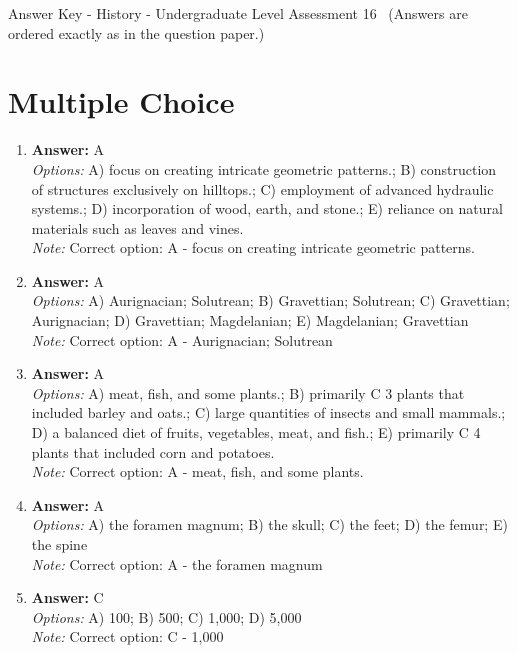 \documentclass[12pt]{article}
\begin{document}
\begin{center}
Answer Key - History - Undergraduate Level Assessment 16 \
\small (Answers are ordered exactly as in the question paper.)
\end{center}

\section*{Multiple Choice}
\begin{enumerate}[label=\arabic*.]
\item \textbf{Answer:} A
\\ \textit{Options:} A) focus on creating intricate geometric patterns.; B) construction of structures exclusively on hilltops.; C) employment of advanced hydraulic systems.; D) incorporation of wood, earth, and stone.; E) reliance on natural materials such as leaves and vines.
\\ \textit{Note:} Correct option: A - focus on creating intricate geometric patterns.
\item \textbf{Answer:} A
\\ \textit{Options:} A) Aurignacian; Solutrean; B) Gravettian; Solutrean; C) Gravettian; Aurignacian; D) Gravettian; Magdelanian; E) Magdelanian; Gravettian
\\ \textit{Note:} Correct option: A - Aurignacian; Solutrean
\item \textbf{Answer:} A
\\ \textit{Options:} A) meat, fish, and some plants.; B) primarily C 3 plants that included barley and oats.; C) large quantities of insects and small mammals.; D) a balanced diet of fruits, vegetables, meat, and fish.; E) primarily C 4 plants that included corn and potatoes.
\\ \textit{Note:} Correct option: A - meat, fish, and some plants.
\item \textbf{Answer:} A
\\ \textit{Options:} A) the foramen magnum; B) the skull; C) the feet; D) the femur; E) the spine
\\ \textit{Note:} Correct option: A - the foramen magnum
\item \textbf{Answer:} C
\\ \textit{Options:} A) 100; B) 500; C) 1,000; D) 5,000
\\ \textit{Note:} Correct option: C - 1,000
\end{enumerate}
\end{document}
